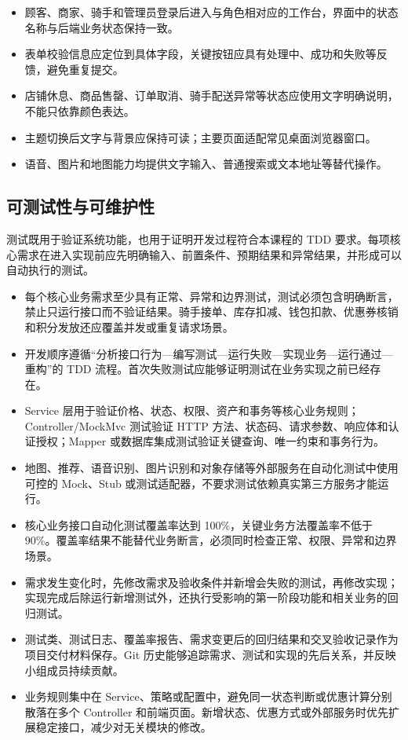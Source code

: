 \begin{itemize}
\item 顾客、商家、骑手和管理员登录后进入与角色相对应的工作台，界面中的状态名称与后端业务状态保持一致。
\item 表单校验信息应定位到具体字段，关键按钮应具有处理中、成功和失败等反馈，避免重复提交。
\item 店铺休息、商品售罄、订单取消、骑手配送异常等状态应使用文字明确说明，不能只依靠颜色表达。
\item 主题切换后文字与背景应保持可读；主要页面适配常见桌面浏览器窗口。
\item 语音、图片和地图能力均提供文字输入、普通搜索或文本地址等替代操作。
\end{itemize}

\subsection{可测试性与可维护性}

测试既用于验证系统功能，也用于证明开发过程符合本课程的 TDD 要求。每项核心需求在进入实现前应先明确输入、前置条件、预期结果和异常结果，并形成可以自动执行的测试。

\begin{itemize}
\item 每个核心业务需求至少具有正常、异常和边界测试，测试必须包含明确断言，禁止只运行接口而不验证结果。骑手接单、库存扣减、钱包扣款、优惠券核销和积分发放还应覆盖并发或重复请求场景。
\item 开发顺序遵循“分析接口行为—编写测试—运行失败—实现业务—运行通过—重构”的 TDD 流程。首次失败测试应能够证明测试在业务实现之前已经存在。
\item Service 层用于验证价格、状态、权限、资产和事务等核心业务规则；Controller/MockMvc 测试验证 HTTP 方法、状态码、请求参数、响应体和认证授权；Mapper 或数据库集成测试验证关键查询、唯一约束和事务行为。
\item 地图、推荐、语音识别、图片识别和对象存储等外部服务在自动化测试中使用可控的 Mock、Stub 或测试适配器，不要求测试依赖真实第三方服务才能运行。
\item 核心业务接口自动化测试覆盖率达到 100\%，关键业务方法覆盖率不低于 90\%。覆盖率结果不能替代业务断言，必须同时检查正常、权限、异常和边界场景。
\item 需求发生变化时，先修改需求及验收条件并新增会失败的测试，再修改实现；实现完成后除运行新增测试外，还执行受影响的第一阶段功能和相关业务的回归测试。
\item 测试类、测试日志、覆盖率报告、需求变更后的回归结果和交叉验收记录作为项目交付材料保存。Git 历史能够追踪需求、测试和实现的先后关系，并反映小组成员持续贡献。
\item 业务规则集中在 Service、策略或配置中，避免同一状态判断或优惠计算分别散落在多个 Controller 和前端页面。新增状态、优惠方式或外部服务时优先扩展稳定接口，减少对无关模块的修改。
\end{itemize}

